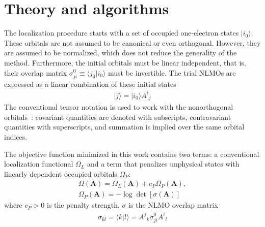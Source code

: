 \documentclass[aps,prl,reprint,amsmath,amssymb]{revtex4-1}
\newcommand{\ket}[1]{\ensuremath{\vert #1 \rangle}}
\newcommand{\braket}[2]{\ensuremath{\langle #1 \vert #2 \rangle}} %
\begin{document}
\section{Theory and algorithms}

The localization procedure starts with a set of occupied one-electron states $\ket{i_0}$. 
These orbitals are not assumed to be canonical or even orthogonal. 
However, they are assumed to be normalized, which does not reduce the generality of the method. 
Furthermore, the initial orbitals must be linear independent, that is, their overlap matrix $\sigma_{ji}^0 \equiv \braket{j_0}{i_0}$ must be invertible. 
The trial NLMOs are expressed as a linear combination of these initial states
%
\begin{equation}
\begin{split}
\ket{j} = \ket{i_0} {A^i}_j  
\end{split}
\end{equation}
%
The conventional tensor notation is used to work with the nonorthogonal orbitals~\cite{head1998tensor}: covariant quantities are denoted with subscripts, contravariant quantities with superscripts, and summation is implied over the same orbital indices.

The objective function minimized in this work contains two terms: a conventional localization functional $\Omega_L$ and a term that penalizes unphysical states with linearly dependent occupied orbitals $\Omega_P$:
%
\begin{equation} \label{eq:fun-pen}
\begin{split}
\Omega(\mathbf{A}) = \Omega_L(\mathbf{A}) + c_P \Omega_P(\mathbf{A}), \\
\Omega_P(\mathbf{A}) = - \log \det \left[ \sigma (\mathbf{A}) \right]
\end{split}
\end{equation}
%
where $c_P > 0$ is the penalty strength, $\sigma$ is the NLMO overlap matrix 
%
\begin{equation}
\begin{split}
\sigma_{kl} = \braket{k}{l} = {A^j}_k \sigma_{ji}^0{A^i}_l
\end{split}
\end{equation}
%
\end{document}

